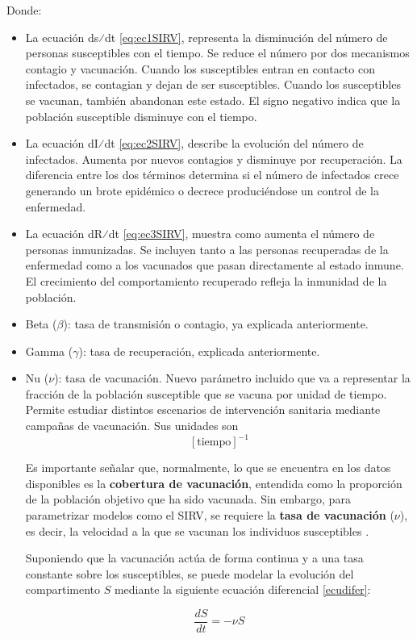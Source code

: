 Donde:
\begin{itemize}
    \item 	La ecuación ds⁄dt \eqref{eq:ec1SIRV}, representa la disminución del número de personas susceptibles con el tiempo. Se reduce el número por dos mecanismos contagio y vacunación. Cuando los susceptibles entran en contacto con infectados, se contagian y dejan de ser susceptibles. Cuando los susceptibles se vacunan, también abandonan este estado. El signo negativo indica que la población susceptible disminuye con el tiempo.
    \item 	La ecuación dI⁄dt \eqref{eq:ec2SIRV}, describe la evolución del número de infectados. Aumenta por nuevos contagios y disminuye por recuperación. La diferencia entre los dos términos determina si el número de infectados crece generando un brote epidémico o decrece produciéndose un control de la enfermedad.
    \item 	La ecuación dR⁄dt \eqref{eq:ec3SIRV}, muestra como aumenta el número de personas inmunizadas. Se incluyen tanto a las personas recuperadas de la enfermedad como a los vacunados que pasan directamente al estado inmune. El crecimiento del comportamiento recuperado refleja la inmunidad de la población.
    \item 	Beta ($\beta$): tasa de transmisión o contagio, ya explicada anteriormente.
    \item 	Gamma ($\gamma$): tasa de recuperación, explicada anteriormente.
    \item	Nu ($\nu$): tasa de vacunación. Nuevo parámetro incluido que va a representar la fracción de la población susceptible que se vacuna por unidad de tiempo. Permite estudiar distintos escenarios de intervención sanitaria mediante campañas de vacunación. Sus unidades son
\[
[\text{tiempo}]^{-1}
\]

Es importante señalar que, normalmente, lo que se encuentra en los datos disponibles es la \textbf{cobertura de vacunación}, entendida como la proporción de la población objetivo que ha sido vacunada. Sin embargo, para parametrizar modelos como el SIRV, se requiere la \textbf{tasa de vacunación} ($\nu$), es decir, la velocidad a la que se vacunan los individuos susceptibles \cite{keeling2008modeling}.

Suponiendo que la vacunación actúa de forma continua y a una tasa constante sobre los susceptibles, se puede modelar la evolución del compartimento $S$ mediante la siguiente ecuación diferencial \eqref{ecudifer}:


\begin{equation}
\frac{dS}{dt} = -\nu S
\label{ecudifer}
\end{equation}


\end{itemize}
